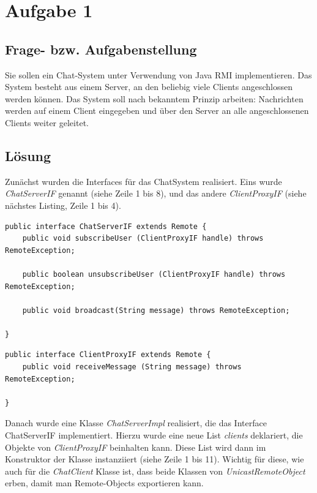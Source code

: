 \newcommand{\env}[1]{\texttt{#1}}
\newcommand{\command}[1]{\texttt{#1}}
\newcommand{\package}[1]{\texttt{\itshape#1}}
\newcommand{\engl}[1]{(engl: \textit{#1})\xspace}
\setlength{\parindent}{0pt}
\newpage

\section{Aufgabe 1}\cite{[1,2]}

\subsection{Frage- bzw. Aufgabenstellung}

Sie sollen ein Chat-System unter Verwendung von Java RMI implementieren. Das System besteht aus einem Server, an den beliebig viele Clients angeschlossen werden können. Das System soll nach bekanntem Prinzip arbeiten: Nachrichten werden auf einem Client eingegeben und über den Server an alle angeschlossenen Clients weiter geleitet.

\subsection{Lösung}

Zunächst wurden die Interfaces für das ChatSystem realisiert. Eins wurde \textit{ChatServerIF} genannt (siehe Zeile 1 bis 8), und das andere \textit{ClientProxyIF} (siehe nächstes Listing, Zeile 1 bis 4).

\begin{lstlisting}
public interface ChatServerIF extends Remote {
	public void subscribeUser (ClientProxyIF handle) throws RemoteException;
	
	public boolean unsubscribeUser (ClientProxyIF handle) throws RemoteException;
	
	public void broadcast(String message) throws RemoteException;
	
}
\end{lstlisting}

\begin{lstlisting}
public interface ClientProxyIF extends Remote {
	public void receiveMessage (String message) throws RemoteException;
	
}
\end{lstlisting}


Danach wurde eine Klasse \textit{ChatServerImpl} realisiert, die das Interface ChatServerIF implementiert. Hierzu wurde eine neue List \textit{clients} deklariert, die Objekte von \textit{ClientProxyIF} beinhalten kann. Diese List wird dann im Konstruktor der Klasse instanziiert (siehe Zeile 1 bis 11). Wichtig für diese, wie auch für die \textit{ChatClient} Klasse ist, dass beide Klassen von \textit{UnicastRemoteObject} erben, damit man Remote-Objects exportieren kann.

